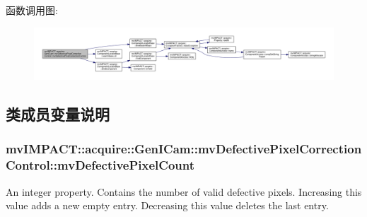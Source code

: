 函数调用图\+:
\nopagebreak
\begin{figure}[H]
\begin{center}
\leavevmode
\includegraphics[width=350pt]{classmv_i_m_p_a_c_t_1_1acquire_1_1_gen_i_cam_1_1mv_defective_pixel_correction_control_aae69ade3611d8ec28ff1074e0182404a_cgraph}
\end{center}
\end{figure}




\subsection{类成员变量说明}
\hypertarget{classmv_i_m_p_a_c_t_1_1acquire_1_1_gen_i_cam_1_1mv_defective_pixel_correction_control_a4f7d37dd9b5ecd6469ab5f847929d1cf}{
\subsubsection[{mv\+Defective\+Pixel\+Count}]{ mv\+I\+M\+P\+A\+C\+T\+::acquire\+::\+Gen\+I\+Cam\+::mv\+Defective\+Pixel\+Correction\+Control\+::mv\+Defective\+Pixel\+Count}}\label{classmv_i_m_p_a_c_t_1_1acquire_1_1_gen_i_cam_1_1mv_defective_pixel_correction_control_a4f7d37dd9b5ecd6469ab5f847929d1cf}


An integer property. Contains the number of valid defective pixels. Increasing this value adds a new empty entry. Decreasing this value deletes the last entry. 

